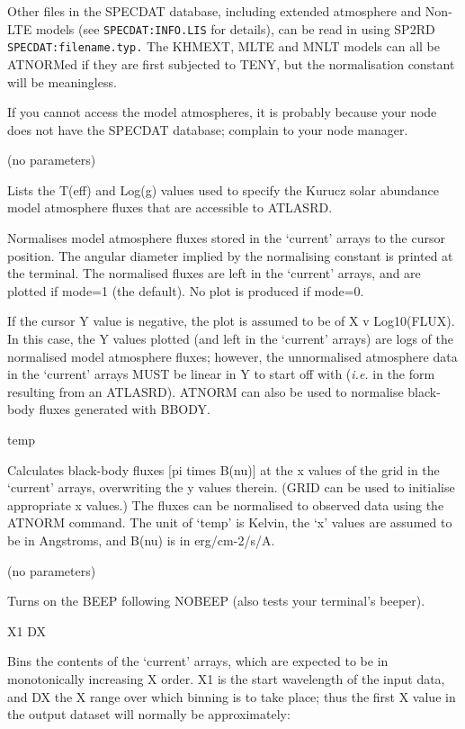 \begin {description}
Other files in the SPECDAT database, including extended atmosphere and
Non-LTE models (see {\tt SPECDAT:INFO.LIS} for details), can be read in
using SP2RD {\tt SPECDAT:\-filename.\-typ.} The KHMEXT, MLTE and MNLT
models can all be ATNORMed if they are first subjected to TENY, but
the normalisation constant will be meaningless.

If you cannot access the model atmospheres, it is probably because
your node does not have the SPECDAT database;  complain to your node
manager.

\item [ATLIST] (no parameters)

Lists the T(eff) and Log(g) values used to specify the Kurucz solar
abundance model atmosphere fluxes that are accessible to ATLASRD.

\item [ATNORM] [mode]

Normalises model atmosphere fluxes stored in the `current' arrays to
the cursor position. The angular diameter implied by the normalising
constant is printed at the terminal. The normalised fluxes are left in
the `current' arrays, and are plotted if mode=1 (the default). No plot
is produced if mode=0.

If the cursor Y value is negative, the plot is assumed to be of X v
Log10(FLUX). In this case, the Y values plotted (and left in the
`current' arrays) are logs of the normalised model atmosphere fluxes; 
however, the unnormalised atmosphere data in the `current' arrays MUST
be linear in Y to start off with ({\em i.e.} in the form resulting
from an ATLASRD). ATNORM can also be used to normalise black-body
fluxes generated with BBODY.

\item [BBODY] temp

Calculates black-body fluxes [pi times B(nu)] at the x values of the
grid in the `current' arrays, overwriting the y values therein. (GRID
can be used to initialise appropriate x values.) The fluxes can be
normalised to observed data using the ATNORM command. The unit of
`temp' is Kelvin, the `x' values are assumed to be in Angstroms, and
B(nu) is in erg/cm-2/s/A.

\item [BEEP] (no parameters)

Turns on the BEEP following NOBEEP (also tests your terminal's beeper).

\item [BIN] X1 DX

Bins the contents of the `current' arrays, which are expected to be in
monotonically increasing X order. X1 is the start wavelength of the
input data, and DX the X range over which binning is to take place;
thus the first X value in the output dataset will normally be
approximately:


\end{description}
